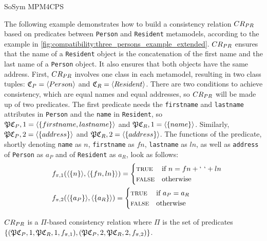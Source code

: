 \begin{copiedFrom}{SoSym MPM4CPS}
\begin{example}
The following example demonstrates how to build a consistency relation $CR_{PR}$ based on predicates between \texttt{Person} and \texttt{Resident} metamodels, according to the example in \autoref{fig:compatibility:three_persons_example_extended}. $CR_{PR}$ ensures that the name of a \texttt{Resident} object is the concatenation of the first name and the last name of a \texttt{Person} object. It also ensures that both objects have the same address. First, $CR_{PR}$ involves one class in
each metamodel, resulting in two class tuples: $\mathfrak{C}_{P} = \langle Person \rangle$ and $\mathfrak{C}_{R} = \langle Resident \rangle$. There are two conditions to achieve consistency, which are equal names and equal addresses, so $CR_{PR}$ will be made up of two predicates. The first predicate needs the \texttt{firstname} and \texttt{lastname} attributes in \texttt{Person} and the \texttt{name} in \texttt{Resident}, so $\mathfrak{P}{\mathfrak{C}_{P}, 1} = \langle \{firstname, lastname\} \rangle$ and $\mathfrak{P}{\mathfrak{C}_{R}, 1} = \langle \{name\} \rangle$. Similarly, $\mathfrak{P}{\mathfrak{C}_{P}, 2} = \langle \{address\} \rangle$ and $\mathfrak{P}{\mathfrak{C}_{R}, 2} = \langle \{address\} \rangle$.
The functions of the predicate, shortly denoting \texttt{name} as $n$, \texttt{firstname} as $fn$, \texttt{lastname} as $ln$, as well as \texttt{address} of \texttt{Person} as $a_P$ and of \texttt{Resident} as $a_R$, look as follows:
\begin{align*}
   \hspace{1em} &
   f_{\pi, 1}(\langle \{n\} \rangle, \langle \{fn, ln\} \rangle) = \begin{cases} 
      \textsc{true} & \text{if}\ n = fn + `\ ` + ln \\
      \textsc{false} & \text{otherwise}
   \end{cases} \\
   &
   f_{\pi, 2}(\langle \{a_P\} \rangle, \langle \{a_R\} \rangle) = \begin{cases} 
      \textsc{true} & \text{if}\ a_P = a_R \\
      \textsc{false} & \text{otherwise}
   \end{cases}
\end{align*}

$CR_{PR}$ is a $\Pi$-based consistency relation where $\Pi$ is the set of predicates $\{(\mathfrak{P}{\mathfrak{C}_{P}, 1}, \mathfrak{P}{\mathfrak{C}_{R}, 1}, f_{\pi, 1}), (\mathfrak{P}{\mathfrak{C}_{P}, 2}, \mathfrak{P}{\mathfrak{C}_{R}, 2}, f_{\pi, 2})\}$.
\end{example}


\end{copiedFrom}
